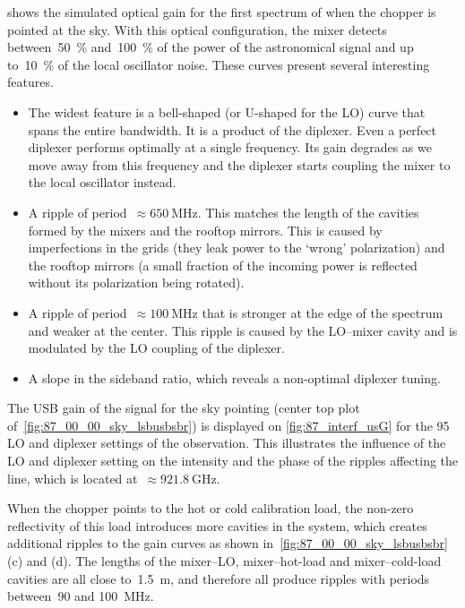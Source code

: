  shows the simulated optical gain for the first spectrum of  when the chopper is pointed at the sky.
With this optical configuration, the mixer detects between~\SI{50}{\percent} and~\SI{100}{\percent} of the power of the astronomical signal and up to~\SI{10}{\percent} of the local oscillator noise.
These curves present several interesting features.
\begin{itemize}[noitemsep,nolistsep]
    \item The widest feature is a bell-shaped (or U-shaped for the LO) curve that spans the entire bandwidth.  It is a product of the diplexer.  Even a perfect diplexer performs optimally at a single frequency.  Its gain degrades as we move away from this frequency and the diplexer starts coupling the mixer to the local oscillator instead.
    \item A ripple of period~$\approx \SI{650}{\mega\hertz}$.
    This matches the length of the cavities formed by the mixers and the rooftop mirrors.
    This is caused by imperfections in the grids (they leak power to the `wrong' polarization) and the rooftop mirrors (a small fraction of the incoming power is reflected without its polarization being rotated).
    \item A ripple of period~$\approx \SI{100}{\mega\hertz}$ that is stronger at the edge of the spectrum and weaker at the center.
    This ripple is caused by the LO--mixer cavity and is modulated by the LO coupling of the diplexer.
    \item A slope in the sideband ratio, which reveals a non-optimal diplexer tuning.
\end{itemize}

The USB gain of the signal for the sky pointing (center top plot of~\cref{fig:87_00_00_sky_lsbusbsbr}) is displayed on \cref{fig:87_interf_usG} for the 95 LO and diplexer settings of the  observation.
This illustrates the influence of the LO and diplexer setting on the intensity and the phase of the ripples affecting the line, which is located at~$\approx \SI{921.8}{\giga\hertz}$.

When the chopper points to the hot or cold calibration load, the non-zero reflectivity of this load introduces more cavities in the system, which creates additional ripples to the gain curves as shown in~\cref{fig:87_00_00_sky_lsbusbsbr} (c) and (d).
The lengths of the mixer--LO, mixer--hot-load and mixer--cold-load cavities are all close to~\SI{1.5}{\meter}, and therefore all produce ripples with periods between~\num{90} and \SI{100}{\mega\hertz}.

